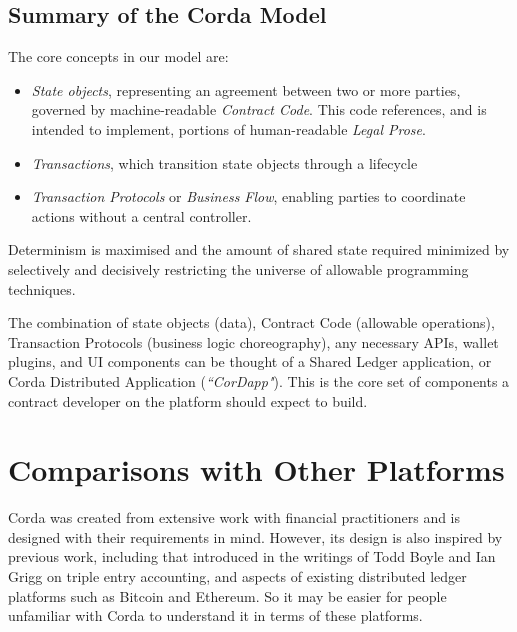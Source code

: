 \documentclass{article}
\begin{document}
\subsection{Summary of the Corda Model}
The core concepts in our model are:
\begin{itemize}

\item \textit{State objects}, representing an agreement between two or more parties, governed by machine-readable \textit{Contract Code}. This code references, and is intended to implement, portions of human-readable \textit{Legal Prose}. \item \textit{Transactions}, which transition state objects through a lifecycle
\item \textit{Transaction Protocols} or \textit{Business Flow}, enabling parties to coordinate actions without a central controller.
\end{itemize}

Determinism is maximised and the amount of shared state required minimized by selectively and decisively restricting the universe of allowable programming techniques.

The combination of state objects (data), Contract Code (allowable operations), Transaction Protocols (business logic choreography), any necessary APIs, wallet plugins, and UI components can be thought of a Shared Ledger application, or Corda Distributed Application (\textit{``CorDapp"}). This is the core set of components a contract developer on the platform should expect to build. 



\section{Comparisons with Other Platforms}
Corda was created from extensive work with financial practitioners and is designed with their requirements in mind. However, its design is also inspired by previous work, including that introduced in the writings of Todd Boyle and Ian Grigg on triple entry accounting\cite{Triple}, and aspects of existing distributed ledger platforms such as Bitcoin\cite{Bitcoin} and Ethereum. So it may be easier for people unfamiliar with Corda to understand it in terms of these platforms. 
\end{document}
